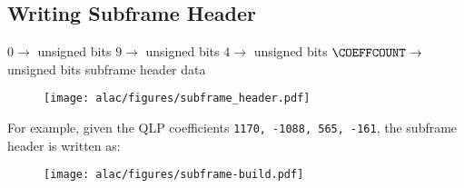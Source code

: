 

\clearpage



\subsection{Writing Subframe Header}
\label{alac:write_subframe_header}
$0 \rightarrow$  unsigned bits
$9 \rightarrow$  unsigned bits
$4 \rightarrow$  unsigned bits
$\text{\COEFFCOUNT} \rightarrow$  unsigned bits\;
\Return subframe header data\;
\EALGORITHM
\begin{figure}[h]
\texttt{[image: alac/figures/subframe\_header.pdf]}
\end{figure}
\par
\noindent
For example, given the QLP coefficients
\texttt{1170, -1088, 565, -161},
the subframe header is written as:
\begin{figure}[h]
\texttt{[image: alac/figures/subframe-build.pdf]}
\end{figure}
